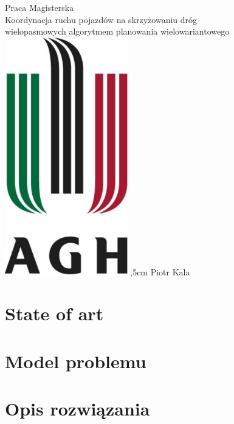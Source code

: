 \documentclass{report}
\begin{document}
  \begin{titlepage}
      \centering
      \vfill
      {\Large
          Praca Magisterska \\                                     
          \vskip1cm
          Koordynacja ruchu pojazdów na skrzyżowaniu dróg \\
          wielopasmowych algorytmem planowania wielowariantowego}  
      \vskip2cm
      \includegraphics[width=0.4\textwidth]{logo_agh.eps}
      ,5cm
      \Large Piotr Kala\\
  \end{titlepage}
  \section{State of art}
  
  \newpage
  \section{Model problemu}
  
  \newpage
  \section{Opis rozwiązania}
  
\end{document}

